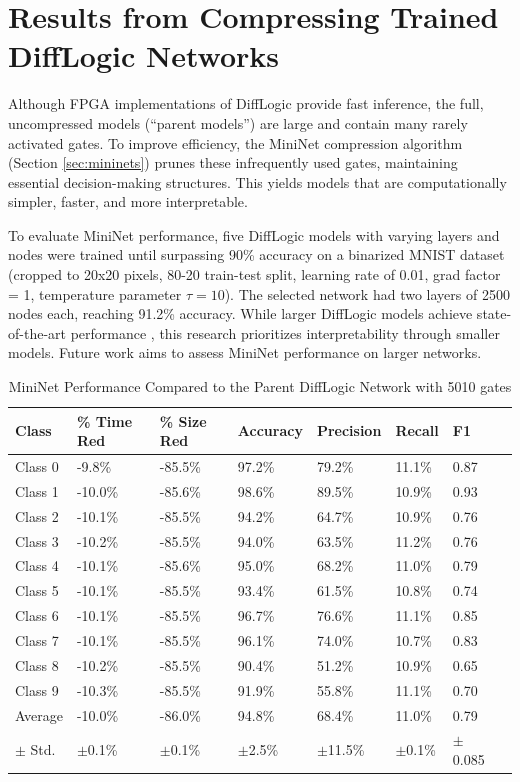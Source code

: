 \section{Results from Compressing Trained DiffLogic Networks}
\label{sec:results_compression}

Although FPGA implementations of DiffLogic provide fast inference, the full, uncompressed models (``parent models'') are large and contain many rarely activated gates. To improve efficiency, the MiniNet compression algorithm (Section \ref{sec:mininets}) prunes these infrequently used gates, maintaining essential decision-making structures. This yields models that are computationally simpler, faster, and more interpretable.

To evaluate MiniNet performance, five DiffLogic models with varying layers and nodes were trained until surpassing 90\% accuracy on a binarized MNIST dataset (cropped to 20x20 pixels, 80-20 train-test split, learning rate of 0.01, grad factor = 1, temperature parameter $\tau=10$). The selected network had two layers of 2500 nodes each, reaching 91.2\% accuracy. While larger DiffLogic models achieve state-of-the-art performance \cite{difflogic}, this research prioritizes interpretability through smaller models. Future work aims to assess MiniNet performance on larger networks.

\begin{table}[htbp]
\caption{MiniNet Performance Compared to the Parent DiffLogic Network with 5010 gates}
\label{tab:mininets}
\begin{tabularx}{\textwidth}{lXXXXXXX}
\hline
Class & \% Time Red & \% Size Red & Accuracy & Precision & Recall & F1 \\
\hline
Class 0 & -9.8\% & -85.5\% & 97.2\% & 79.2\% & 11.1\% & 0.87 \\
Class 1 & -10.0\% & -85.6\% & 98.6\% & 89.5\% & 10.9\% & 0.93 \\
Class 2 & -10.1\% & -85.5\% & 94.2\% & 64.7\% & 10.9\% & 0.76 \\
Class 3 & -10.2\% & -85.5\% & 94.0\% & 63.5\% & 11.2\% & 0.76 \\
Class 4 & -10.1\% & -85.6\% & 95.0\% & 68.2\% & 11.0\% & 0.79 \\
Class 5 & -10.1\% & -85.5\% & 93.4\% & 61.5\% & 10.8\% & 0.74 \\
Class 6 & -10.1\% & -85.5\% & 96.7\% & 76.6\% & 11.1\% & 0.85 \\
Class 7 & -10.1\% & -85.5\% & 96.1\% & 74.0\% & 10.7\% & 0.83 \\
Class 8 & -10.2\% & -85.5\% & 90.4\% & 51.2\% & 10.9\% & 0.65 \\
Class 9 & -10.3\% & -85.5\% & 91.9\% & 55.8\% & 11.1\% & 0.70 \\
Average & -10.0\% & -86.0\% & 94.8\% & 68.4\% & 11.0\% & 0.79 \\
$\pm$ Std. & $\pm$0.1\% & $\pm$0.1\% & $\pm$2.5\% & $\pm$11.5\% & $\pm$0.1\% & $\pm$0.085 \\
\hline
\end{tabularx}
\end{table}


